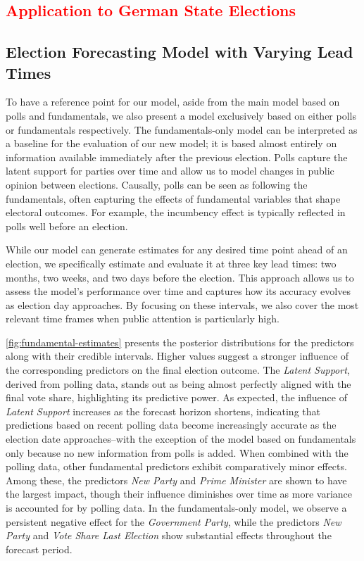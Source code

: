 \documentclass[doublespaced,12pt]{article}
\begin{document}
\begin{doublespacing}
\FloatBarrier

\section{\textcolor{red}{Application to German State Elections}}

\subsection{Election Forecasting Model with Varying Lead Times}

To have a reference point for our model, aside from the main model based on polls and fundamentals, we also present a model exclusively based on either polls or fundamentals respectively. The fundamentals-only model can be interpreted as a baseline for the evaluation of our new model; it is based almost entirely on information available immediately after the previous election. Polls capture the latent support for parties over time and allow us to model changes in public opinion between elections. Causally, polls can be seen as following the fundamentals, often capturing the effects of fundamental variables that shape electoral outcomes. For example, the incumbency effect is typically reflected in polls well before an election. 

While our model can generate estimates for any desired time point ahead of an election, we specifically estimate and evaluate it at three key lead times: two months, two weeks, and two days before the election. This approach allows us to assess the model’s performance over time and captures how its accuracy evolves as  election day approaches. By focusing on these intervals, we also cover the most relevant time frames when public attention is particularly high.

\autoref{fig:fundamental-estimates} presents the posterior distributions for the predictors along with their credible intervals. Higher values suggest a stronger influence of the corresponding predictors on the final election outcome.
The \textit{Latent Support}, derived from polling data, stands out as being almost perfectly aligned with the final vote share, highlighting its predictive power. As expected, the influence of \textit{Latent Support} increases as the forecast horizon shortens, indicating that predictions based on recent polling data become increasingly accurate as the election date approaches--with the exception of the model based on fundamentals only because no new information from polls is added.
When combined with the polling data, other fundamental predictors exhibit comparatively minor effects. Among these, the predictors \textit{New Party} and \textit{Prime Minister} are shown to have the largest impact, though their influence diminishes over time as more variance is accounted for by polling data.
In the fundamentals-only model, we observe a persistent negative effect for the \textit{Government Party}, while the predictors \textit{New Party} and \textit{Vote Share Last Election} show substantial effects throughout the forecast period.


\end{doublespacing}
\end{document}

